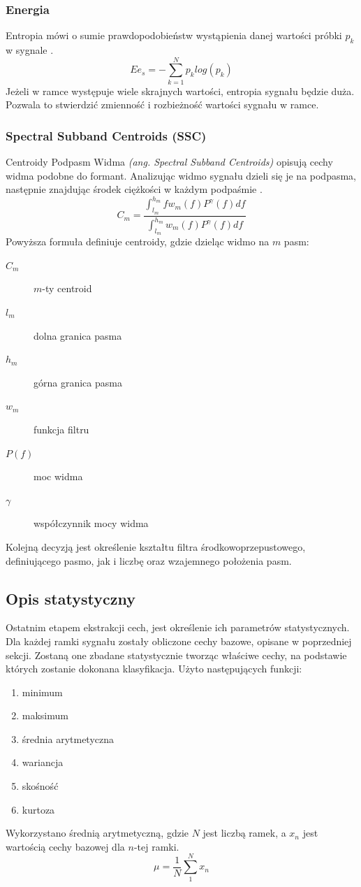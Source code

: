 \documentclass[a4paper,12pt,twoside,openany]{report}
\newcommand{\ang}[1]{\textit{(ang. #1)}}
\begin{document}
\subsubsection{Energia}
Entropia mówi o sumie prawdopodobieństw wystąpienia danej wartości próbki $p_k$ w sygnale \cite{Majstorovic2011}.
\begin{equation}
	Ee_{s}=-\sum _{k=1}^{N}p_k log(p_k)
	\label{eq:entropy}
\end{equation}
Jeżeli w ramce występuje wiele skrajnych wartości, entropia sygnału będzie duża. 
Pozwala to stwierdzić zmienność i rozbieżność wartości sygnału w ramce.
\subsubsection{Spectral Subband Centroids (SSC)}
Centroidy Podpasm Widma \ang{Spectral Subband Centroids} opisują cechy widma podobne do formant.
Analizując widmo sygnału dzieli się je na podpasma, następnie znajdując środek ciężkości w każdym podpaśmie \cite{Majstorovic2011}.
\begin{equation}
	C_m=\frac
	{\int_{l_m}^{h_m} f w_m(f) P^\gamma(f)df}
	{\int_{l_m}^{h_m} w_m(f) P^\gamma(f)df}
	\label{eq:ssc}
\end{equation}
Powyższa formuła definiuje centroidy, gdzie dzieląc widmo na $m$ pasm:
\begin{description}
	\item[$C_m$] $m$-ty centroid
	\item[$l_m$] dolna granica pasma
	\item[$h_m$] górna granica pasma
	\item[$w_m$] funkcja filtru
	\item[$P(f)$] moc widma
	\item[$\gamma$] współczynnik mocy widma
\end{description}
Kolejną decyzją jest określenie kształtu filtra środkowoprzepustowego, definiującego pasmo, 
jak i liczbę oraz wzajemnego położenia pasm.
\subsection{Opis statystyczny}
Ostatnim etapem ekstrakcji cech, jest określenie ich parametrów statystycznych.
Dla każdej ramki sygnału zostały obliczone cechy bazowe, opisane w poprzedniej sekcji.
Zostaną one zbadane statystycznie tworząc właściwe cechy, na podstawie których zostanie dokonana klasyfikacja.
Użyto następujących funkcji:
\begin{enumerate}
	\item minimum 
	\item maksimum 
	\item średnia arytmetyczna
	\item wariancja 
	\item skośność
	\item kurtoza
\end{enumerate}
Wykorzystano średnią arytmetyczną, gdzie $N$ jest liczbą ramek, a $x_n$ jest wartością cechy bazowej dla $n$-tej ramki.
\begin{equation}
	\mu = \frac{1}{N}\sum_1^Nx_n
\end{equation}
\end{document}
